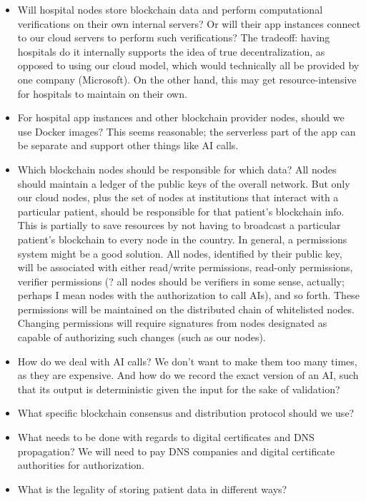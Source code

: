 \documentclass[12pt]{article}
\begin{document}
\begin{itemize}
\item Will hospital nodes store blockchain data and perform computational verifications on their own internal servers? Or will their app instances connect to our cloud servers to perform such verifications? The tradeoff: having hospitals do it internally supports the idea of true decentralization, as opposed to using our cloud model, which would technically all be provided by one company (Microsoft). On the other hand, this may get resource-intensive for hospitals to maintain on their own.

\item For hospital app instances and other blockchain provider nodes, should we use Docker images? This seems reasonable; the serverless part of the app can be separate and support other things like AI calls.

\item Which blockchain nodes should be responsible for which data? All nodes should maintain a ledger of the public keys of the overall network. But only our cloud nodes, plus the set of nodes at institutions that interact with a particular patient, should be responsible for that patient's blockchain info. This is partially to save resources by not having to broadcast a particular patient's blockchain to every node in the country. In general, a permissions system might be a good solution. All nodes, identified by their public key, will be associated with either read/write permissions, read-only permissions, verifier permissions (? all nodes should be verifiers in some sense, actually; perhaps I mean nodes with the authorization to call AIs), and so forth. These permissions will be maintained on the distributed chain of whitelisted nodes. Changing permissions will require signatures from nodes designated as capable of authorizing such changes (such as our nodes).

\item How do we deal with AI calls? We don't want to make them too many times, as they are expensive. And how do we record the exact version of an AI, such that its output is deterministic given the input for the sake of validation?

\item What specific blockchain consensus and distribution protocol should we use?

\item What needs to be done with regards to digital certificates and DNS propagation? We will need to pay DNS companies and digital certificate authorities for authorization.

\item What is the legality of storing patient data in different ways?

\end{itemize}
\end{document}
